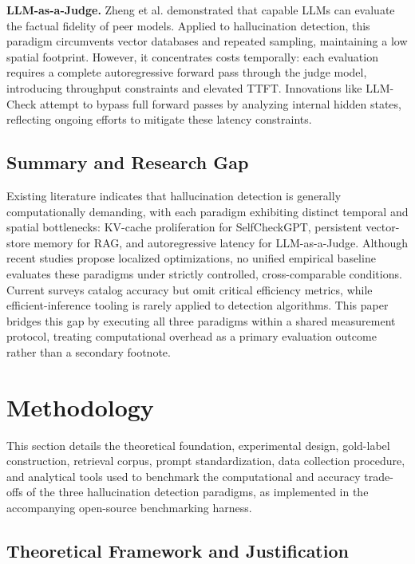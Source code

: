 \documentclass[conference]{IEEEtran}
\begin{document}
\textbf{LLM-as-a-Judge.} Zheng et al. \cite{zheng2023judging} demonstrated that capable LLMs can evaluate the factual fidelity of peer models. Applied to hallucination detection, this paradigm circumvents vector databases and repeated sampling, maintaining a low spatial footprint. However, it concentrates costs temporally: each evaluation requires a complete autoregressive forward pass through the judge model, introducing throughput constraints and elevated TTFT. Innovations like LLM-Check \cite{sriramanan2024llmcheck} attempt to bypass full forward passes by analyzing internal hidden states, reflecting ongoing efforts to mitigate these latency constraints.

\subsection{Summary and Research Gap}

Existing literature indicates that hallucination detection is generally computationally demanding, with each paradigm exhibiting distinct temporal and spatial bottlenecks: KV-cache proliferation for SelfCheckGPT, persistent vector-store memory for RAG, and autoregressive latency for LLM-as-a-Judge. Although recent studies propose localized optimizations, no unified empirical baseline evaluates these paradigms under strictly controlled, cross-comparable conditions. Current surveys catalog accuracy but omit critical efficiency metrics, while efficient-inference tooling is rarely applied to detection algorithms. This paper bridges this gap by executing all three paradigms within a shared measurement protocol, treating computational overhead as a primary evaluation outcome rather than a secondary footnote.

\section{Methodology}

This section details the theoretical foundation, experimental design, gold-label construction, retrieval corpus, prompt standardization, data collection procedure, and analytical tools used to benchmark the computational and accuracy trade-offs of the three hallucination detection paradigms, as implemented in the accompanying open-source benchmarking harness.

\subsection{Theoretical Framework and Justification}
\end{document}
